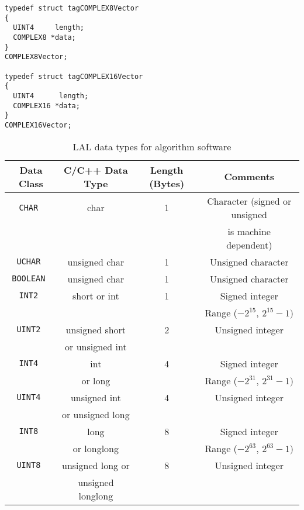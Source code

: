 \documentclass[]{ligodcc}
\begin{document}
{\footnotesize
\begin{verbatim}
typedef struct tagCOMPLEX8Vector
{
  UINT4     length;
  COMPLEX8 *data;
}
COMPLEX8Vector;

typedef struct tagCOMPLEX16Vector
{
  UINT4      length;
  COMPLEX16 *data;
}
COMPLEX16Vector;
\end{verbatim}}


\begin{table}
\caption{LAL data types for algorithm software}
\label{tab:laldatatypes}
\begin{tabular}{|c|c|c|c|}
\hline
{\bf Data Class} & {\bf C/C++ Data Type} & {\bf Length (Bytes)} & {\bf Comments} \\
\hline
\hline
{\tt CHAR     } &  char             & 1 & Character (signed or unsigned    \\
{\tt          } &                   &   & is machine dependent)            \\
\hline
{\tt UCHAR    } &  unsigned char    & 1 & Unsigned character               \\
\hline
{\tt BOOLEAN  } &  unsigned char    & 1 & Unsigned character               \\
\hline
{\tt INT2     } &  short or int     & 1 & Signed integer                   \\
{\tt          } &                   &   & Range ($-2^{15}$, $2^{15}-1)$    \\
\hline
{\tt UINT2    } &  unsigned short   & 2 & Unsigned integer                 \\
{\tt          } &  or unsigned int  &   &                                  \\
\hline
{\tt INT4     } &     int           & 4 & Signed integer                   \\
{\tt          } &   or long         &   & Range ($-2^{31}$, $2^{31}-1)$    \\
\hline
{\tt UINT4    } &  unsigned int     & 4 & Unsigned integer                 \\
{\tt          } & or unsigned long  &   &                                  \\
\hline
{\tt  INT8    } &  long             & 8 & Signed integer                   \\
{\tt          } & or longlong       &   & Range ($-2^{63}$, $2^{63}-1)$    \\
\hline
{\tt UINT8    } & unsigned long or  & 8 & Unsigned integer                 \\
{\tt          } & unsigned longlong &   &                                  \\

\end{tabular}
\end{table}
\end{document}
